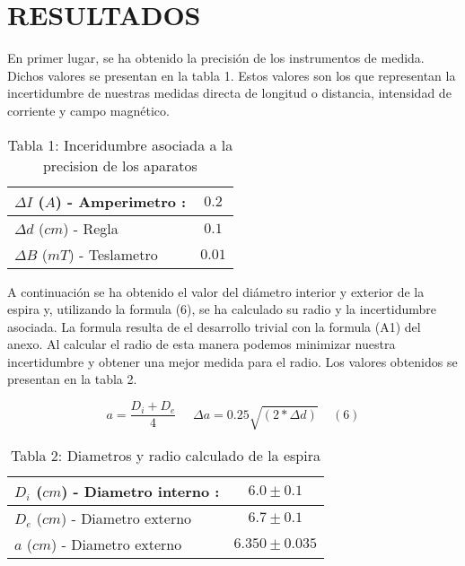 \documentclass[article, 11pt]{report}
\begin{document}
\newpage

	\section{RESULTADOS}

En primer lugar, se ha obtenido la precisión de los instrumentos de medida. Dichos valores se presentan en la tabla 1. Estos valores son los que representan la incertidumbre de nuestras medidas directa de longitud o distancia, intensidad de corriente y campo magnético.


\begin{table}[H]
	\begin{center}
		\begin{tabular}{ |m{7.5cm}  |   c  | }
			\hline
			$\Delta I$ ($A$) - Amperimetro :  &   $ 0.2$ \\ \hline
			$ \Delta d$ ($cm$) - Regla	 &  $ 0.1$ \\  \hline
			$\Delta B$ ($mT$) - Teslametro &  $0.01$   \\  \hline
		\end{tabular}
		\label{Tab:1}
		\caption*{Tabla 1: Inceridumbre asociada a la precision de los aparatos}
	\end{center}
\end{table}


A continuación se ha obtenido el valor del diámetro interior y exterior de la espira y, utilizando la formula (6), se ha calculado su radio y la incertidumbre asociada. La formula resulta de el desarrollo trivial con la formula (A1) del anexo. Al calcular el radio de esta manera podemos minimizar nuestra incertidumbre y obtener una mejor medida para el radio. Los valores obtenidos se presentan en la tabla 2. 

$$ a= \dfrac{D_i + D_e}{4} ~~~~~~ \Delta a = 0.25\sqrt{(2*\Delta d)} ~~~~~(6)$$


\begin{table}[H]
	\begin{center}
		\begin{tabular}{ |m{7.5cm}  |   c  | }
			\hline
			$D_i$ ($cm$) - Diametro interno :  &   $ 6.0 \pm 0.1$ \\ \hline
			$ D_e$ ($cm$) - Diametro externo	 &  $ 6.7 \pm 0.1$ \\  \hline
			$ a $ ($cm$) - Diametro externo	 &  $ 6.350 \pm 0.035$ \\  \hline
		\end{tabular}
		\label{Tab:1}
		\caption*{Tabla 2: Diametros y radio calculado de la espira}
	\end{center}
\end{table}
\end{document}

